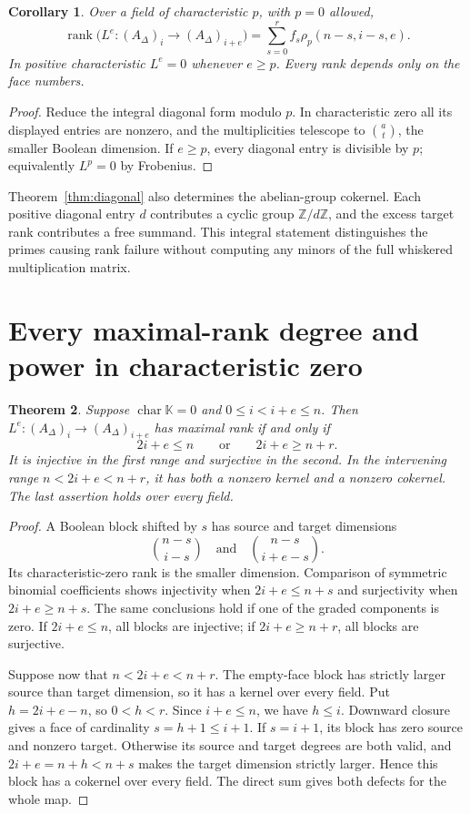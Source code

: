 \documentclass[11pt]{article}
\newtheorem{theorem}{Theorem}[section]
\newtheorem{corollary}[theorem]{Corollary}
\theoremstyle{remark}
\newcommand{\kk}{\mathbb K}
\newcommand{\ZZ}{\mathbb Z}
\newcommand{\rk}{\operatorname{rank}}
\begin{document}
\begin{corollary}\label{cor:ranks}
Over a field of characteristic $p$, with $p=0$ allowed,
\begin{equation}\label{eq:rankformula}
 \rk\bigl(L^e:(A_\Delta)_i\to(A_\Delta)_{i+e}\bigr)
 =\sum_{s=0}^r f_s\rho_p(n-s,i-s,e).
\end{equation}
In positive characteristic $L^e=0$ whenever $e\geq p$. Every rank depends only on the face numbers.
\end{corollary}
\begin{proof}
Reduce the integral diagonal form modulo $p$. In characteristic zero all its displayed entries are nonzero, and the multiplicities telescope to $\binom at$, the smaller Boolean dimension. If $e\geq p$, every diagonal entry is divisible by $p$; equivalently $L^p=0$ by Frobenius.
\end{proof}

Theorem~\ref{thm:diagonal} also determines the abelian-group cokernel. Each positive diagonal entry $d$ contributes a cyclic group $\ZZ/d\ZZ$, and the excess target rank contributes a free summand. This integral statement distinguishes the primes causing rank failure without computing any minors of the full whiskered multiplication matrix.

\section{Every maximal-rank degree and power in characteristic zero}
\begin{theorem}\label{thm:locus}
Suppose $\operatorname{char}\kk=0$ and $0\leq i<i+e\leq n$. Then $L^e:(A_\Delta)_i\to(A_\Delta)_{i+e}$ has maximal rank if and only if
\[
 2i+e\leq n\qquad\text{or}\qquad 2i+e\geq n+r.
\]
It is injective in the first range and surjective in the second. In the intervening range $n<2i+e<n+r$, it has both a nonzero kernel and a nonzero cokernel. The last assertion holds over every field.
\end{theorem}
\begin{proof}
A Boolean block shifted by $s$ has source and target dimensions
\[
 \binom{n-s}{i-s}\quad\text{and}\quad\binom{n-s}{i+e-s}.
\]
Its characteristic-zero rank is the smaller dimension. Comparison of symmetric binomial coefficients shows injectivity when $2i+e\leq n+s$ and surjectivity when $2i+e\geq n+s$. The same conclusions hold if one of the graded components is zero. If $2i+e\leq n$, all blocks are injective; if $2i+e\geq n+r$, all blocks are surjective.

Suppose now that $n<2i+e<n+r$. The empty-face block has strictly larger source than target dimension, so it has a kernel over every field. Put $h=2i+e-n$, so $0<h<r$. Since $i+e\leq n$, we have $h\leq i$. Downward closure gives a face of cardinality $s=h+1\leq i+1$. If $s=i+1$, its block has zero source and nonzero target. Otherwise its source and target degrees are both valid, and $2i+e=n+h<n+s$ makes the target dimension strictly larger. Hence this block has a cokernel over every field. The direct sum gives both defects for the whole map.
\end{proof}
\end{document}
